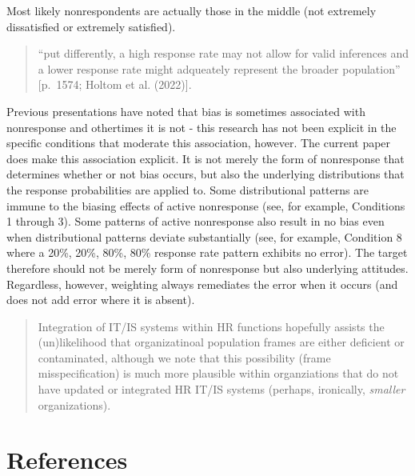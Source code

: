 \documentclass[
  man,mask]{apa7}
\begin{document}
Most likely nonrespondents are actually those in the middle (not extremely dissatisfied or extremely satisfied).

\begin{quote}
``put differently, a high response rate may not allow for valid inferences and a lower response rate might adqueately represent the broader population'' {[}p.~1574; Holtom et al. (2022){]}.
\end{quote}

Previous presentations have noted that bias is sometimes associated with nonresponse and othertimes it is not - this research has not been explicit in the specific conditions that moderate this association, however. The current paper does make this association explicit. It is not merely the form of nonresponse that determines whether or not bias occurs, but also the underlying distributions that the response probabilities are applied to. Some distributional patterns are immune to the biasing effects of active nonresponse (see, for example, Conditions 1 through 3). Some patterns of active nonresponse also result in no bias even when distributional patterns deviate substantially (see, for example, Condition 8 where a 20\%, 20\%, 80\%, 80\% response rate pattern exhibits no error). The target therefore should not be merely form of nonresponse but also underlying attitudes. Regardless, however, weighting always remediates the error when it occurs (and does not add error where it is absent).

\begin{quote}
Integration of IT/IS systems within HR functions hopefully assists the (un)likelihood that organizatinoal population frames are either deficient or contaminated, although we note that this possibility (frame misspecification) is much more plausible within organziations that do not have updated or integrated HR IT/IS systems (perhaps, ironically, \emph{smaller} organizations).
\end{quote}

\newpage

\section{References}\label{references}

\begingroup
\setlength{\parindent}{-0.5in}
\setlength{\leftskip}{0.5in}
\end{document}
